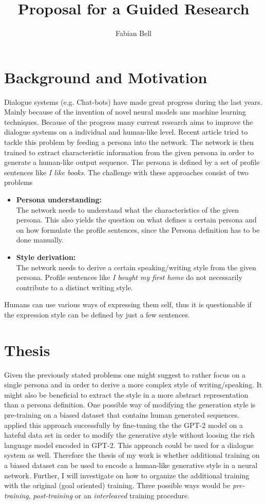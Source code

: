 \documentclass[11pt]{article}
\title{Proposal for a Guided Research}
\author{Fabian Bell}
\date
\begin{document}
\maketitle
\section{Background and Motivation}
Dialogue systems (e.g. Chat-bots) have made great progress during the last years. Mainly because of the invention of novel neural models ans machine learning techniques. Because of the progress many current research aims to improve the dialogue systems on a individual and human-like level. Recent article \cite[]{DBLP:journals/corr/abs-1901-08149, liu2020impress} tried to tackle this problem by feeding a persona into the network. The network is then trained to extract characteristic information from the given persona in order to generate a human-like output sequence. The persona is defined by a set of profile sentences like \textit{I like books}. The challenge with these approaches consist of two problems
\begin{itemize}
\item \textbf{Persona understanding:}\\
The network needs to understand what the characteristics of the given persona. This also yields the question on what defines a certain persona and on how formulate the profile sentences, since the Persona definition has to be done manually. 
\item \textbf{Style derivation:}\\
The network needs to derive a certain speaking/writing style from the given persona. Profile sentences like \textit{I bought my first home} \cite[]{liu2020impress} do not necessarily contribute to a distinct writing style.
\end{itemize}
Humans can use various ways of expressing them self, thus it is questionable if the expression style can be defined by just a few sentences. 
\section{Thesis}
Given the previously stated problems one might suggest to rather focus on a single persona and in order to derive a more complex style of writing/speaking. It might also be beneficial to extract the style in a more abstract representation than a persona definition. One possible way of modifying the generation style is pre-training on a biased dataset that contains human generated sequences. \cite[]{wullach2020hate} applied this approach successfully by fine-tuning the the GPT-2 model \cite[]{Radford2019LanguageMA} on a hateful data set in order to modify the generative style without loosing the rich language model encoded in GPT-2. 
This approach could be used for a dialogue system as well. Therefore the thesis of my work is whether additional training on a biased dataset can be used to encode a human-like generative style in a neural network. Further, I will investigate on how to organize the additional training with the original (goal oriented) training. Three possible ways would be \textit{pre-training}, \textit{post-training} or an \textit{interleaved} training procedure. 
\end{document}
